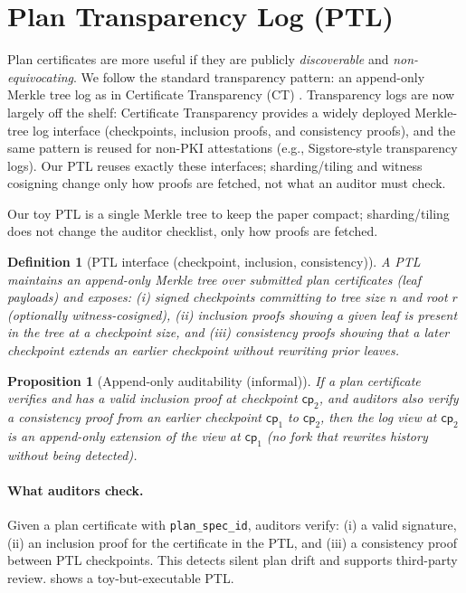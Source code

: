 \documentclass[11pt]{article}
\newtheorem{definition}{Definition}
\newtheorem{proposition}{Proposition}
\begin{document}
\section{Plan Transparency Log (PTL)}
Plan certificates are more useful if they are publicly \emph{discoverable} and \emph{non-equivocating}.
We follow the standard transparency pattern: an append-only Merkle tree log as in Certificate Transparency (CT) \cite{rfc6962,rfc9162}.
Transparency logs are now largely off the shelf: Certificate Transparency provides a widely deployed
Merkle-tree log interface (checkpoints, inclusion proofs, and consistency proofs), and the same pattern is reused
for non-PKI attestations (e.g., Sigstore-style transparency logs).
Our PTL reuses exactly these interfaces; sharding/tiling and witness cosigning change only how proofs are fetched,
not what an auditor must check.\cite{rfc6962,rfc9162,rekorDocs}

Our toy PTL is a single Merkle tree to keep the paper compact; sharding/tiling does not change the auditor checklist, only how proofs are fetched.\cite{tileBasedLogsTransparencyDev}

\begin{definition}[PTL interface (checkpoint, inclusion, consistency)]
A PTL maintains an append-only Merkle tree over submitted plan certificates (leaf payloads) and exposes:
(i) \emph{signed checkpoints} committing to tree size $n$ and root $r$ (optionally witness-cosigned),
(ii) \emph{inclusion proofs} showing a given leaf is present in the tree at a checkpoint size, and
(iii) \emph{consistency proofs} showing that a later checkpoint extends an earlier checkpoint without rewriting prior leaves.
\end{definition}

\begin{proposition}[Append-only auditability (informal)]
If a plan certificate verifies and has a valid inclusion proof at checkpoint $\mathsf{cp}_2$, and auditors also verify a consistency proof from an earlier checkpoint $\mathsf{cp}_1$ to $\mathsf{cp}_2$, then the log view at $\mathsf{cp}_2$ is an append-only extension of the view at $\mathsf{cp}_1$ (no fork that rewrites history without being detected).
\end{proposition}


\paragraph{What auditors check.}
Given a plan certificate with \texttt{plan\_spec\_id}, auditors verify:
(i) a valid signature,
(ii) an inclusion proof for the certificate in the PTL, and
(iii) a consistency proof between PTL checkpoints.
This detects silent plan drift and supports third-party review.
 shows a toy-but-executable PTL.
\end{document}
